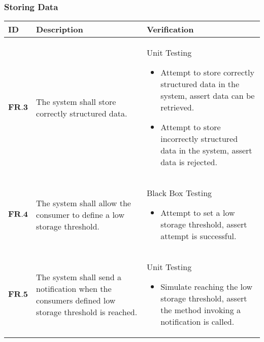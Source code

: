 \subsubsection{Storing Data}
\begin{longtable}[H]{| p{1.5cm} | p{4.5cm} | p{10.5cm}| }
        \hline
        \cellcolor{titleColor}\textbf{ID}    & \cellcolor{titleColor}\textbf{Description}                                                                                                                           & \cellcolor{titleColor}\textbf{Verification}                                                                                                                                                                                                                                                                    
        \\ \hline
        $\textbf{FR.3}$  & The system shall store correctly structured data.                                                                                              & Unit Testing\begin{itemize} \item Attempt to store correctly structured data in the system, assert data can be retrieved.\item Attempt to store incorrectly structured data in the system, assert data is rejected.\end{itemize}                                \\ \hline
        $\textbf{FR.4} $ & The system shall allow the consumer to define a low storage threshold.                                                                         & Black Box Testing\begin{itemize} \item Attempt to set a low storage threshold, assert attempt is successful.\end{itemize}                                                                                                                                                           \\ \hline
        $\textbf{FR.5}$  & The system shall send a notification when the consumers defined low storage threshold is reached.                                              & Unit Testing\begin{itemize} \item Simulate reaching the low storage threshold, assert the method invoking a notification is called.\end{itemize}                                                                                                                               \\ \hline

\end{longtable}
